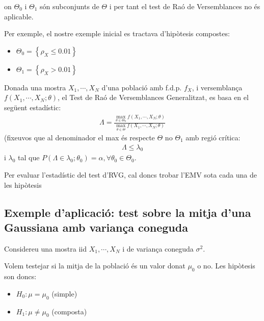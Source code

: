 \documentclass[letterpaper,10pt,english]{sphinxmanual}
\begin{document}
on \(\Theta_0\) i \(\Theta_1\) són subconjunts de \(\Theta\) i
per tant el test de Raó de Versemblances no és aplicable.

Per exemple, el nostre exemple inicial es tractava d’hipòtesis compostes:
\begin{itemize}
\item {} 
\(\Theta_0 = \left\{\rho_X \leq 0.01 \right\}\)

\item {} 
\(\Theta_1 = \left\{\rho_X > 0.01 \right\}\)

\end{itemize}

Donada una mostra \(X_1, \cdots, X_N\)
d’una població amb f.d.p. \(f_X\), i versemblança
\(f(X_1, \cdots, X_N; \theta)\), el Test de Raó de Versemblances Generalitzat, es basa en el següent estadístic:
\begin{equation*}
\begin{split}\Lambda = \frac{\max_{\theta \in \Theta_{0}} f(X_1, \cdots, X_N; \theta)}{\max_{\theta \in \Theta} f(X_1, \cdots, X_N; \theta)}\end{split}
\end{equation*}
(fixeu\sphinxhyphen{}vos que al denominador el max és respecte \(\Theta\) no \(\Theta_1\)
amb regió crítica:
\begin{equation*}
\begin{split}\Lambda \leq \lambda_0\end{split}
\end{equation*}
i \(\lambda_0\) tal que \(P(\Lambda \in \lambda_0; \theta_0) = \alpha, \forall \theta_0 \in \Theta_0\).

Per evaluar l’estadístic del test d’RVG, cal doncs trobar l’EMV sota cada una de les hipòtesis


\subsection{Exemple d’aplicació: test sobre la mitja d’una Gaussiana amb variança coneguda}
\label{\detokenize{0_Intro/0_4_Tests:exemple-d-aplicacio-test-sobre-la-mitja-d-una-gaussiana-amb-varianca-coneguda}}
Considereu una mostra iid \(X_1, \cdots, X_N\)  i
de variança coneguda \(\sigma^2\).

Volem testejar si la mitja de la població és un valor donat \(\mu_0\) o no.
Les hipòtesis son doncs:
\begin{itemize}
\item {} 
\(H_0: \mu= \mu_0\) (simple)

\item {} 
\(H_1: \mu \neq \mu_0\) (composta)

\end{itemize}
\end{document}
